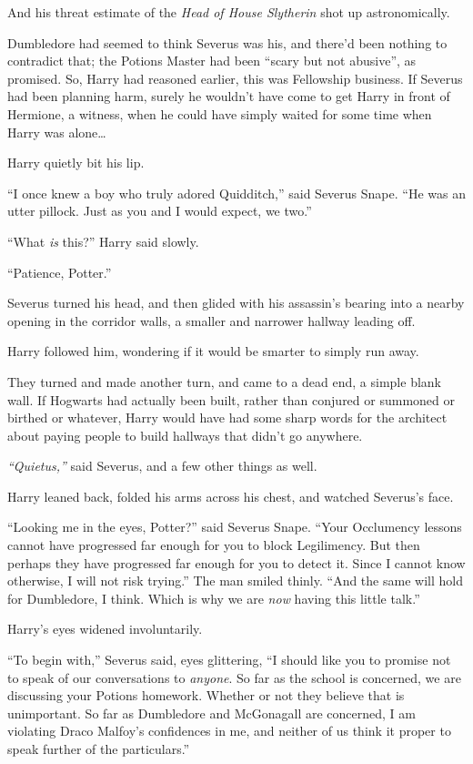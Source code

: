 And his threat estimate of the \emph{Head of House Slytherin} shot up
astronomically.

Dumbledore had seemed to think Severus was his, and there'd been nothing
to contradict that; the Potions Master had been ``scary but not
abusive'', as promised. So, Harry had reasoned earlier, this was
Fellowship business. If Severus had been planning harm, surely he
wouldn't have come to get Harry in front of Hermione, a witness, when he
could have simply waited for some time when Harry was alone\ldots{}

Harry quietly bit his lip.

``I once knew a boy who truly adored Quidditch,'' said Severus Snape.
``He was an utter pillock. Just as you and I would expect, we two.''

``What \emph{is} this?'' Harry said slowly.

``Patience, Potter.''

Severus turned his head, and then glided with his assassin's bearing
into a nearby opening in the corridor walls, a smaller and narrower
hallway leading off.

Harry followed him, wondering if it would be smarter to simply run away.

They turned and made another turn, and came to a dead end, a simple
blank wall. If Hogwarts had actually been built, rather than conjured or
summoned or birthed or whatever, Harry would have had some sharp words
for the architect about paying people to build hallways that didn't go
anywhere.

\emph{``Quietus,''} said Severus, and a few other things as well.

Harry leaned back, folded his arms across his chest, and watched
Severus's face.

``Looking me in the eyes, Potter?'' said Severus Snape. ``Your
Occlumency lessons cannot have progressed far enough for you to block
Legilimency. But then perhaps they have progressed far enough for you to
detect it. Since I cannot know otherwise, I will not risk trying.'' The
man smiled thinly. ``And the same will hold for Dumbledore, I think.
Which is why we are \emph{now} having this little talk.''

Harry's eyes widened involuntarily.

``To begin with,'' Severus said, eyes glittering, ``I should like you to
promise not to speak of our conversations to \emph{anyone}. So far as
the school is concerned, we are discussing your Potions homework.
Whether or not they believe that is unimportant. So far as Dumbledore
and McGonagall are concerned, I am violating Draco Malfoy's confidences
in me, and neither of us think it proper to speak further of the
particulars.''

